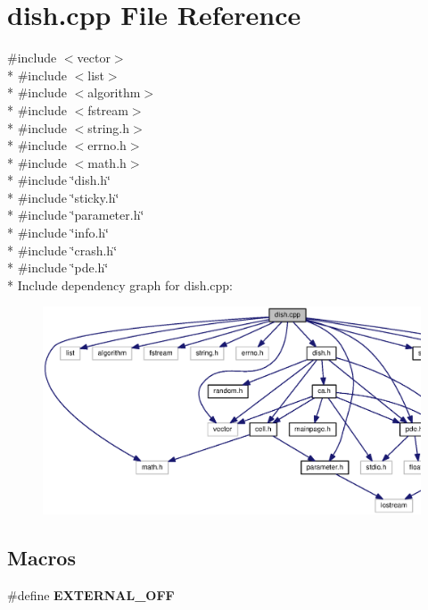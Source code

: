 \section{dish.\-cpp File Reference}
\label{dish_8cpp}
{\ttfamily \#include $<$vector$>$}\\*
{\ttfamily \#include $<$list$>$}\\*
{\ttfamily \#include $<$algorithm$>$}\\*
{\ttfamily \#include $<$fstream$>$}\\*
{\ttfamily \#include $<$string.\-h$>$}\\*
{\ttfamily \#include $<$errno.\-h$>$}\\*
{\ttfamily \#include $<$math.\-h$>$}\\*
{\ttfamily \#include \char`\"{}dish.\-h\char`\"{}}\\*
{\ttfamily \#include \char`\"{}sticky.\-h\char`\"{}}\\*
{\ttfamily \#include \char`\"{}parameter.\-h\char`\"{}}\\*
{\ttfamily \#include \char`\"{}info.\-h\char`\"{}}\\*
{\ttfamily \#include \char`\"{}crash.\-h\char`\"{}}\\*
{\ttfamily \#include \char`\"{}pde.\-h\char`\"{}}\\*
Include dependency graph for dish.\-cpp\-:
\nopagebreak
\begin{figure}[H]
\begin{center}
\leavevmode
\includegraphics[width=350pt]{dish_8cpp__incl}
\end{center}
\end{figure}
\subsection*{Macros}
\begin{DoxyCompactItemize}
\item 
\#define {\bf E\-X\-T\-E\-R\-N\-A\-L\-\_\-\-O\-F\-F}
\end{DoxyCompactItemize}
